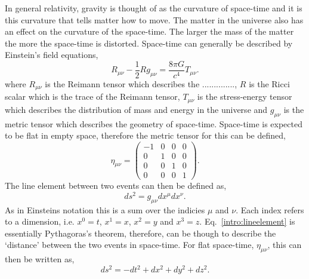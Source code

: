 In general relativity, gravity is thought of as the curvature of space-time and it is this curvature that tells matter how to move. 
The matter in the universe also has an effect on the curvature of the space-time.
The larger the mass of the matter the more the space-time is distorted.
Space-time can generally be described by Einstein's field equations,
\begin{equation}
    R_{\mu \nu} - \frac{1}{2}R g_{\mu \nu} = \frac{8 \pi G}{c^4}T_{\mu \nu}.
\end{equation}
where $R_{\mu \nu}$ is the Reimann tensor which describes the .............., $R$ is the Ricci scalar which is the trace of the Reimann tensor, $T_{\mu \nu}$ is the stress-energy tensor which describes the distribution of mass and energy in the universe and $g_{\mu \nu}$ is the metric tensor which describes the geometry of space-time.
Space-time is expected to be flat in empty space, therefore the metric tensor for this can be defined,
\begin{equation}
\eta_{\mu \nu} = \left(
\begin{matrix}
-1 & 0 & 0 & 0 \\
0 & 1 & 0 & 0 \\
0 & 0 & 1 & 0 \\
0 & 0 & 0 & 1 
\end{matrix}
\right).
\end{equation}
The line element between two events can then be defined as,
\begin{equation}
\label{intro:lineelement}
    ds^2 = g_{\mu \nu} dx^{\mu}dx^{\nu}.
\end{equation}
As in Einsteins notation this is a sum over the indicies $\mu$ and $\nu$. Each index refers to a dimension, i.e. $x^0 = t$, $x^1=x$, $x^2=y$ and $x^3=z$. 
Eq.~\ref{intro:lineelement} is essentially Pythagoras's theorem, therefore, can be though to describe the `distance' between the two events in space-time.
For flat space-time, $\eta_{\mu\nu}$, this can then be written as,
\begin{equation}
    ds^2 = -dt^2 + dx^2 + dy^2 + dz^2.
\end{equation}

